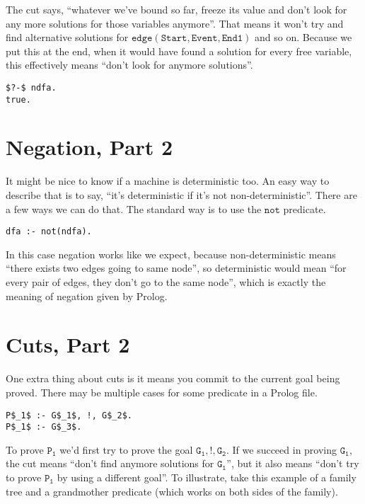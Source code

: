 \documentclass[a4paper,12pt]{article}
\newcommand{\kwa}[1]{\mathtt{#1}}
\begin{document}
\noindent
The cut says, ``whatever we've bound so far, freeze its value and don't look for any more solutions for those variables anymore''. That means it won't try and find alternative solutions for $\kwa{edge(Start, Event, End1)}$ and so on. Because we put this at the end, when it would have found a solution for every free variable, this effectively means ``don't look for anymore solutions''.

\begin{lstlisting}
$?-$ ndfa.
true.
\end{lstlisting}

\section{Negation, Part 2}

It might be nice to know if a machine is deterministic too. An easy way to describe that is to say, ``it's deterministic if it's not non-deterministic''. There are a few ways we can do that. The standard way is to use the $\kwa{not}$ predicate.

\begin{lstlisting}
dfa :- not(ndfa).
\end{lstlisting}

\noindent
In this case negation works like we expect, because non-deterministic means ``there exists two edges going to same node'', so deterministic would mean ``for every pair of edges, they don't go to the same node'', which is exactly the meaning of negation given by Prolog. \\

\section{Cuts, Part 2}

One extra thing about cuts is it means you commit to the current goal being proved. There may be multiple cases for some predicate in a Prolog file.

\begin{lstlisting}
P$_1$ :- G$_1$, !, G$_2$.
P$_1$ :- G$_3$.
\end{lstlisting}

\noindent
To prove $\kwa{P_1}$ we'd first try to prove the goal $\kwa{G_1, !, G_2}$. If we succeed in proving $\kwa{G_1}$, the cut means ``don't find anymore solutions for $\kwa{G_1}$'', but it also means ``don't try to prove $\kwa{P_1}$ by using a different goal''. To illustrate, take this example of a family tree and a grandmother predicate (which works on both sides of the family).
\end{document}
